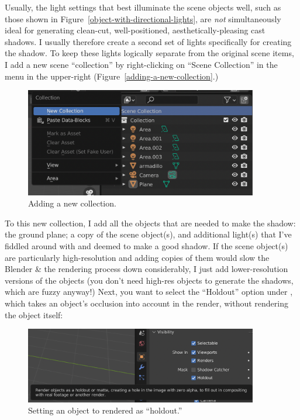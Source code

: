 \documentclass[10pt]{article}
\begin{document}
Usually, the light settings that best illuminate the scene objects well, such as those shown in Figure~\ref{object-with-directional-lights}, are \textit{not} simultaneously ideal for generating clean-cut, well-positioned, aesthetically-pleasing cast shadows. I usually therefore create a second set of lights specifically for creating the shadow. To keep these lights logically separate from the original scene items, I add a new scene ``collection'' by right-clicking on ``Scene Collection'' in the  menu in the upper-right (Figure~\ref{adding-a-new-collection}.)
\begin{figure}[H]
    \centering
    \captionsetup{width=0.8\textwidth}
    \includegraphics[width=4in]{images/adding-a-new-collection.png}
    \caption{Adding a new collection.}
    \label{fig:adding-a-new-collection}
\end{figure}
To this new collection, I add all the objects that are needed to make the shadow: the ground plane; a copy of the scene object(s), and additional light(s) that I've fiddled around with and deemed to make a good shadow. If the scene object(s) are particularly high-resolution and adding copies of them would slow the Blender \& the rendering process down considerably, I just add lower-resolution versions of the objects (you don't need high-res objects to generate the shadows, which are fuzzy anyway!) Next, you want to select the ``Holdout'' option under , which takes an object's occlusion into account in the render, without rendering the object itself:
\begin{figure}[H]
    \centering
    \captionsetup{width=0.8\textwidth}
    \includegraphics[width=4in]{images/holdout.png}
    \caption{Setting an object to rendered as ``holdout.''}
    \label{fig:holdout}
\end{figure}
\end{document}
